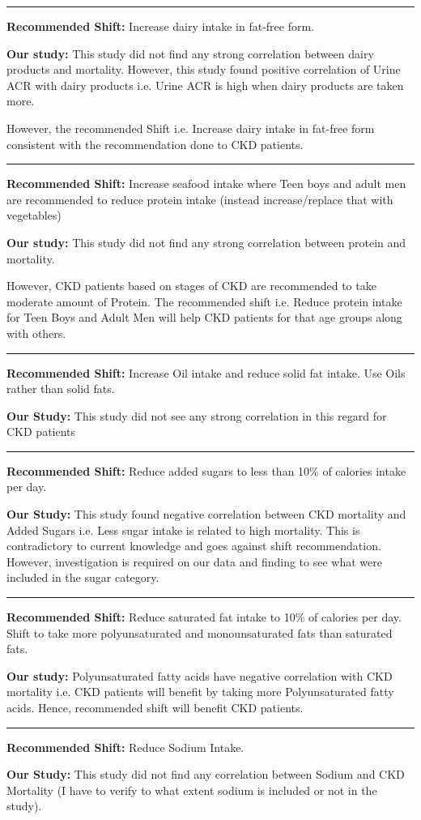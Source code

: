 \noindent\rule{7.8cm}{0.4pt}

\noindent \textbf{Recommended Shift:} Increase dairy intake in fat-free form.

\noindent \textbf{Our study:}  This study did not find any strong correlation between dairy products and mortality. However, this study found positive correlation of Urine ACR with dairy products i.e. Urine ACR is high when dairy products are taken more. 

However, the recommended Shift i.e. Increase dairy intake in fat-free form consistent with the recommendation done to CKD patients.

\noindent\rule{7.8cm}{0.4pt}

\noindent \textbf{Recommended Shift:} Increase seafood intake where Teen boys and adult men are recommended to reduce protein intake (instead increase/replace that with vegetables)

\noindent \textbf{Our study:} This study did not find any strong correlation between protein and mortality. 

However, CKD patients based on stages of CKD are recommended to take moderate amount of Protein. The recommended shift i.e. Reduce protein intake for Teen Boys and Adult Men will help CKD patients for that age groups along with others. 

\noindent\rule{7.8cm}{0.4pt}

\noindent \textbf{Recommended Shift:} Increase Oil intake and reduce solid fat intake. Use Oils rather than solid fats.

\noindent \textbf{Our Study:} This study did not see any strong correlation in this regard for CKD patients

\noindent\rule{7.8cm}{0.4pt}

\noindent \textbf{Recommended Shift:} Reduce added sugars to less than 10\% of calories intake per day. 

\noindent \textbf{Our Study:} This study found negative correlation between CKD mortality and Added Sugars i.e. Less sugar intake is related to high mortality. This is contradictory to current knowledge and goes against shift recommendation. However, investigation is required on our data and finding to see what were included in the sugar category. 

\noindent\rule{7.8cm}{0.4pt}

\noindent \textbf{Recommended Shift:} Reduce saturated fat intake to 10\% of calories per day. Shift to take more  polyunsaturated and monounsaturated fats than saturated fats.

\noindent \textbf{Our study:} Polyunsaturated fatty acids have negative correlation with CKD mortality i.e. CKD patients will benefit by taking more  Polyunsaturated fatty acids. Hence, recommended shift will benefit CKD patients.

\noindent\rule{7.8cm}{0.4pt}

\noindent \textbf{Recommended Shift:} Reduce Sodium Intake.

\noindent \textbf{Our Study:} This study did not find any correlation between Sodium and CKD Mortality (I have to verify to what extent sodium is included or not in the study).

